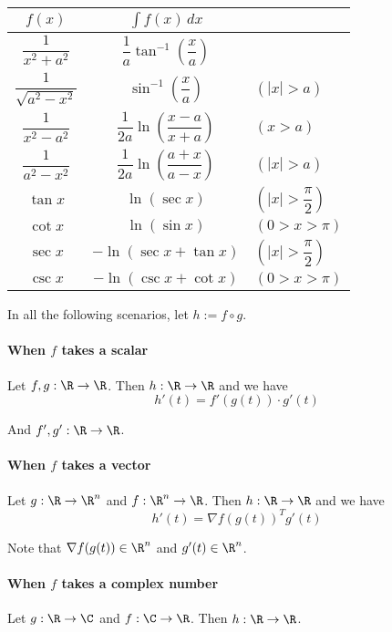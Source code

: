 \label{dbd3301}
\begin{center}
  \renewcommand{\arraystretch}{2.1}\def\d{\displaystyle}
  \begin{tabular}{c|c l}
    $f(x)$                    & $\int f(x)\,dx$                               &                    \\\hline
    $\dfrac1{x^2+a^2}$        & $\dfrac1a\tan^{-1}\left(\dfrac xa\right)$     &                    \\
    $\dfrac1{\sqrt{a^2-x^2}}$ & $\sin^{-1}\left(\dfrac xa\right)$             & $(|x|>a)$          \\
    $\dfrac1{x^2-a^2}$        & $\dfrac1{2a}\ln\left(\dfrac{x-a}{x+a}\right)$ & $(x>a)$            \\
    $\dfrac1{a^2-x^2}$        & $\dfrac1{2a}\ln\left(\dfrac{a+x}{a-x}\right)$ & $(|x|>a)$          \\
    $\tan x$                  & $\ln(\sec x)$                                 & $(|x|>\dfrac\pi2)$ \\
    $\cot x$                  & $\ln(\sin x)$                                 & $(0>x>\pi)$        \\
    $\sec x$                  & $-\ln(\sec x+\tan x)$                         & $(|x|>\dfrac\pi2)$ \\
    $\csc x$                  & $-\ln(\csc x+\cot x)$                         & $(0>x>\pi)$
  \end{tabular}
\end{center}

\label{d969d46}

In all the following scenarios, let $h:=f\circ g$.

\paragraph{When $f$ takes a scalar} Let $f,g:\R\to\R$. Then $h:\R\to\R$ and we have
$$h'(t)=f'(g(t))\cdot g'(t)$$

And $f',g':\R\to\R$.

\paragraph{When $f$ takes a vector} Let $g:\R\to\R^n$ and $f:\R^n\to\R$. Then $h:\R\to\R$ and we have
$$h'(t)=\nabla f(g(t))^Tg'(t)$$

Note that $\nabla f(g(t))\in\R^n$ and $g'(t)\in\R^n$.

\paragraph{When $f$ takes a complex number} Let $g:\R\to\C$ and $f:\C\to\R$. Then $h:\R\to\R$.


